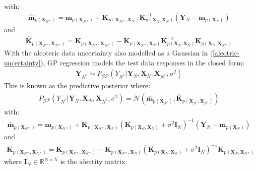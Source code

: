 \documentclass{article}
\newcommand{\GP}{\operatorname{\mathcal{GP}}}
\numberwithin{equation}{section}
\begin{document}
with:
\begin{align}
    \label{gp-epistemic-posterior-mean}
    \hat{\mathbf{m}}_{p(\mathbf{X}_{N*})} = \mathbf{m}_{p(\mathbf{X}_{N*})} + \mathbf{K}_{p(\mathbf{X}_{N*}, \mathbf{X}_N)} \mathbf{K}_{p(\mathbf{X}_N, \mathbf{X}_N)}^{-1} \left( \mathbf{Y}_N - \mathbf{m}_{p(\mathbf{X}_N)}\right)
\end{align}
and
\begin{align}
    \label{gp-epistemic-posterior-covariance}
    \hat{\mathbf{K}}_{p(\mathbf{X}_{N*}, \mathbf{X}_{N*})} = \mathbf{K}_{p(\mathbf{X}_{N*}, \mathbf{X}_{N*})} - \mathbf{K}_{p(\mathbf{X}_{N*}, \mathbf{X}_N)}\mathbf{K}_{p(\mathbf{X}_N, \mathbf{X}_N)}^{-1}\mathbf{K}_{p(\mathbf{X}_N, \mathbf{X}_{N*})}
\end{align}
With the aleoteric data uncertainty also modelled as a Gaussian in (\ref{aleotric-uncertainty}), GP regression models the test data responses in the closed form:
\begin{align}
    \mathbf{Y}_{N^*} \sim P_{\GP}\left(Y_{N^*} \vert \mathbf{Y}_N, \mathbf{X}_N, \mathbf{X}_{N^*}, \sigma^2\right)
    \label{gp-posterior}
\end{align}
This is known as the predictive posterior where:
\begin{align}
    P_{\GP}\left(Y_{N^*} \vert \mathbf{Y}_N, \mathbf{X}_N, \mathbf{X}_{N^*}, \sigma^2\right) = \mathcal{N}\left(\bar{\mathbf{m}}_{p(\mathbf{X}_{N^*})}, \bar{\mathbf{K}}_{p(\mathbf{X}_{N^*}, \mathbf{X}_{N^*})}\right)
    \label{gp-posterior-normal}
\end{align}
with:
\begin{align}
    \label{gp-posterior-mean}
    \bar{\mathbf{m}}_{p(\mathbf{X}_{N*})} = \mathbf{m}_{p(\mathbf{X}_{N*})} + \mathbf{K}_{p(\mathbf{X}_{N*}, \mathbf{X}_N)} \left( \mathbf{K}_{p(\mathbf{X}_N, \mathbf{X}_N)} + \sigma^2 \mathbf{I}_N\right)^{-1} \left( \mathbf{Y}_N - \mathbf{m}_{p(\mathbf{X}_N)}\right)
\end{align}
and
\begin{align}
    \label{gp-posterior-covariance}
    \bar{\mathbf{K}}_{p(\mathbf{X}_{N*}, \mathbf{X}_{N*})} = \mathbf{K}_{p(\mathbf{X}_{N*}, \mathbf{X}_{N*})} - \mathbf{K}_{p(\mathbf{X}_{N*}, \mathbf{X}_N)}\left( \mathbf{K}_{p(\mathbf{X}_N, \mathbf{X}_N)} + \sigma^2 \mathbf{I}_N\right)^{-1}\mathbf{K}_{p(\mathbf{X}_N, \mathbf{X}_{N*})}
\end{align}
where $\mathbf{I}_N \in \mathbb{R}^{N \times N}$ is the identity matrix.
\end{document}
